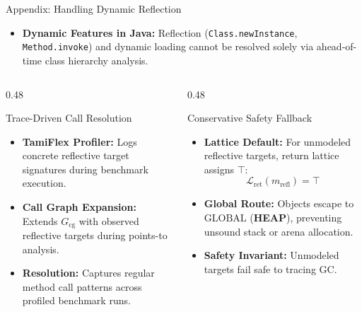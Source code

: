 \documentclass[11pt]{beamer}
\providecommand{\HEAP}{\textbf{HEAP}}
\begin{document}
\begin{frame}{Appendix: Handling Dynamic Reflection}
  \begin{itemize}
    \small
    \item \textbf{Dynamic Features in Java:} Reflection (\texttt{Class.newInstance}, \texttt{Method.invoke}) and dynamic loading cannot be resolved solely via ahead-of-time class hierarchy analysis.
  \end{itemize}
  \vspace{-0.4em}

  \begin{columns}[T]
    \begin{column}{0.48\textwidth}
      \begin{block}{Trace-Driven Call Resolution}
        \scriptsize
        \begin{itemize}\setlength{\itemsep}{2pt}
          \item \textbf{TamiFlex Profiler:} Logs concrete reflective target signatures during benchmark execution.
          \item \textbf{Call Graph Expansion:} Extends $G_{\text{cg}}$ with observed reflective targets during points-to analysis.
          \item \textbf{Resolution:} Captures regular method call patterns across profiled benchmark runs.
        \end{itemize}
      \end{block}
    \end{column}

    \begin{column}{0.48\textwidth}
      \begin{block}{Conservative Safety Fallback}
        \scriptsize
        \begin{itemize}\setlength{\itemsep}{2pt}
          \item \textbf{Lattice Default:} For unmodeled reflective targets, return lattice assigns $\top$:
            $$\mathcal{L}_{\text{ret}}(m_{\text{refl}}) = \top$$
          \item \textbf{Global Route:} Objects escape to $\text{GLOBAL}$ (\HEAP{}), preventing unsound stack or arena allocation.
          \item \textbf{Safety Invariant:} Unmodeled targets fail safe to tracing GC.
        \end{itemize}
      \end{block}
    \end{column}
  \end{columns}
\end{frame}
\end{document}
